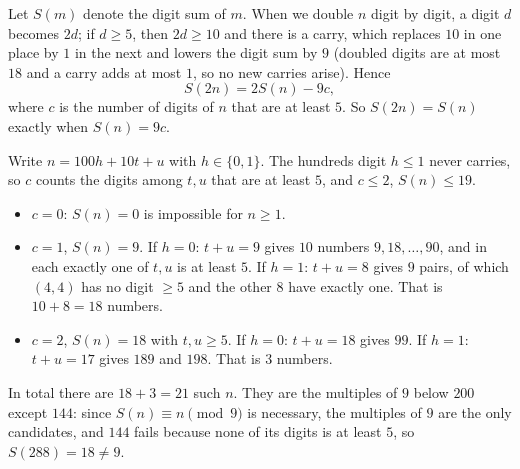 Let $S(m)$ denote the digit sum of $m$. When we double $n$ digit by digit, a digit $d$ becomes $2d$; if $d\ge5$, then $2d\ge10$ and there is a carry, which replaces $10$ in one place by $1$ in the next and lowers the digit sum by $9$ (doubled digits are at most $18$ and a carry adds at most $1$, so no new carries arise). Hence
\[
S(2n)=2S(n)-9c,
\]
where $c$ is the number of digits of $n$ that are at least $5$. So $S(2n)=S(n)$ exactly when $S(n)=9c$.

Write $n=100h+10t+u$ with $h\in\{0,1\}$. The hundreds digit $h\le1$ never carries, so $c$ counts the digits among $t,u$ that are at least $5$, and $c\le2$, $S(n)\le19$.
\begin{itemize}
\item $c=0$: $S(n)=0$ is impossible for $n\ge1$.
\item $c=1$, $S(n)=9$. If $h=0$: $t+u=9$ gives $10$ numbers $9,18,\dots,90$, and in each exactly one of $t,u$ is at least $5$. If $h=1$: $t+u=8$ gives $9$ pairs, of which $(4,4)$ has no digit $\ge5$ and the other $8$ have exactly one. That is $10+8=18$ numbers.
\item $c=2$, $S(n)=18$ with $t,u\ge5$. If $h=0$: $t+u=18$ gives $99$. If $h=1$: $t+u=17$ gives $189$ and $198$. That is $3$ numbers.
\end{itemize}
In total there are $18+3=\boxed{21}$ such $n$. They are the multiples of $9$ below $200$ except $144$: since $S(n)\equiv n\pmod9$ is necessary, the multiples of $9$ are the only candidates, and $144$ fails because none of its digits is at least $5$, so $S(288)=18\ne9$.
